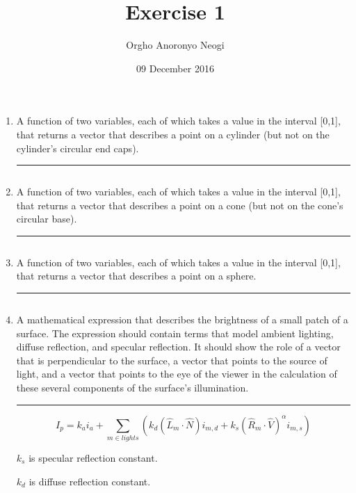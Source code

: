 \documentclass[oneside]{article}
\title{Exercise 1}
\author{Orgho Anoronyo Neogi}
\date{09 December 2016}
\newenvironment{answer}
  {\vspace*{0.2cm} \rule{12cm}{0.02cm} \vspace*{0.2cm}}
  {\vspace*{0.2cm}}
\begin{document}
\maketitle

\begin{enumerate}
	\item A function of two variables, each of which takes a value in the interval [0,1], that returns a vector that describes a point on a cylinder (but not on the cylinder's circular end caps).

	      \begin{answer}
	      	\inputminted[firstline=1, lastline=9]{js}{exercise-1.js}
	      \end{answer}

	\item A function of two variables, each of which takes a value in the interval [0,1], that returns a vector that describes a point on a cone (but not on the cone's circular base).

	      \begin{answer}
	      	\inputminted[firstline=11, lastline=19]{js}{exercise-1.js}
	      \end{answer}

	\item A function of two variables, each of which takes a value in the interval [0,1], that returns a vector that describes a point on a sphere.

	      \begin{answer}
	      	\inputminted[firstline=21, lastline=29]{js}{exercise-1.js}
	      \end{answer}

	\item A mathematical expression that describes the brightness of a small patch of a surface. The expression should contain terms that model ambient lighting, diffuse reflection, and specular reflection. It should show the role of a vector that is perpendicular to the surface, a vector that points to the source of light, and a vector that points to the eye of the viewer in the calculation of these several components of the surface's illumination.

	      \begin{answer}
	      	$$I_p = k_a i_a + \sum_{m\in lights} (k_d (\hat{L}_m \cdot \hat{N}) i_{m,d} + k_s (\hat{R}_m \cdot \hat{V})^{\alpha}i_{m,s})$$

	      	$k_s$ is specular reflection constant.

	      	$k_d$ is diffuse reflection constant.


\end{answer}
\end{enumerate}
\end{document}
